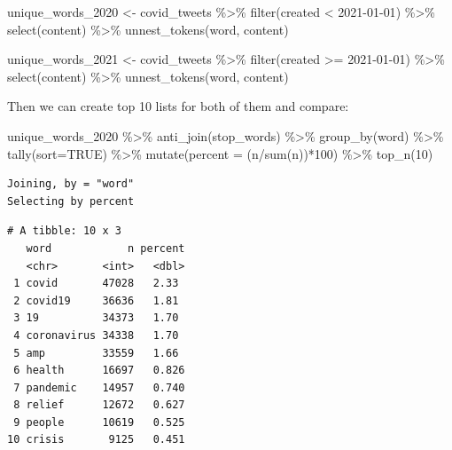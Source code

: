 \documentclass[
  letterpaper,
  DIV=11,
  numbers=noendperiod]{scrreprt}
\newenvironment{Shaded}{\begin{snugshade}}{\end{snugshade}}
\newcommand{\AttributeTok}[1]{\textcolor[rgb]{0.40,0.45,0.13}{#1}}
\newcommand{\ConstantTok}[1]{\textcolor[rgb]{0.56,0.35,0.01}{#1}}
\newcommand{\DecValTok}[1]{\textcolor[rgb]{0.68,0.00,0.00}{#1}}
\newcommand{\FunctionTok}[1]{\textcolor[rgb]{0.28,0.35,0.67}{#1}}
\newcommand{\NormalTok}[1]{\textcolor[rgb]{0.00,0.23,0.31}{#1}}
\newcommand{\OtherTok}[1]{\textcolor[rgb]{0.00,0.23,0.31}{#1}}
\newcommand{\SpecialCharTok}[1]{\textcolor[rgb]{0.37,0.37,0.37}{#1}}
\newcommand{\StringTok}[1]{\textcolor[rgb]{0.13,0.47,0.30}{#1}}
\begin{document}
\begin{Shaded}
\begin{Highlighting}[]
\NormalTok{unique\_words\_2020 }\OtherTok{\textless{}{-}}\NormalTok{ covid\_tweets }\SpecialCharTok{\%\textgreater{}\%}
  \FunctionTok{filter}\NormalTok{(created }\SpecialCharTok{\textless{}} \StringTok{\textquotesingle{}2021{-}01{-}01\textquotesingle{}}\NormalTok{) }\SpecialCharTok{\%\textgreater{}\%}
  \FunctionTok{select}\NormalTok{(content) }\SpecialCharTok{\%\textgreater{}\%}
  \FunctionTok{unnest\_tokens}\NormalTok{(word, content)}

\NormalTok{unique\_words\_2021 }\OtherTok{\textless{}{-}}\NormalTok{ covid\_tweets }\SpecialCharTok{\%\textgreater{}\%}
  \FunctionTok{filter}\NormalTok{(created }\SpecialCharTok{\textgreater{}=} \StringTok{\textquotesingle{}2021{-}01{-}01\textquotesingle{}}\NormalTok{) }\SpecialCharTok{\%\textgreater{}\%}
  \FunctionTok{select}\NormalTok{(content) }\SpecialCharTok{\%\textgreater{}\%}
  \FunctionTok{unnest\_tokens}\NormalTok{(word, content)}
\end{Highlighting}
\end{Shaded}

Then we can create top 10 lists for both of them and compare:

\begin{Shaded}
\begin{Highlighting}[]
\NormalTok{unique\_words\_2020 }\SpecialCharTok{\%\textgreater{}\%}
  \FunctionTok{anti\_join}\NormalTok{(stop\_words) }\SpecialCharTok{\%\textgreater{}\%}
  \FunctionTok{group\_by}\NormalTok{(word) }\SpecialCharTok{\%\textgreater{}\%}
  \FunctionTok{tally}\NormalTok{(}\AttributeTok{sort=}\ConstantTok{TRUE}\NormalTok{) }\SpecialCharTok{\%\textgreater{}\%}
  \FunctionTok{mutate}\NormalTok{(}\AttributeTok{percent =}\NormalTok{ (n}\SpecialCharTok{/}\FunctionTok{sum}\NormalTok{(n))}\SpecialCharTok{*}\DecValTok{100}\NormalTok{) }\SpecialCharTok{\%\textgreater{}\%}
  \FunctionTok{top\_n}\NormalTok{(}\DecValTok{10}\NormalTok{)}
\end{Highlighting}
\end{Shaded}

\begin{verbatim}
Joining, by = "word"
Selecting by percent
\end{verbatim}

\begin{verbatim}
# A tibble: 10 x 3
   word            n percent
   <chr>       <int>   <dbl>
 1 covid       47028   2.33 
 2 covid19     36636   1.81 
 3 19          34373   1.70 
 4 coronavirus 34338   1.70 
 5 amp         33559   1.66 
 6 health      16697   0.826
 7 pandemic    14957   0.740
 8 relief      12672   0.627
 9 people      10619   0.525
10 crisis       9125   0.451
\end{verbatim}
\end{document}
